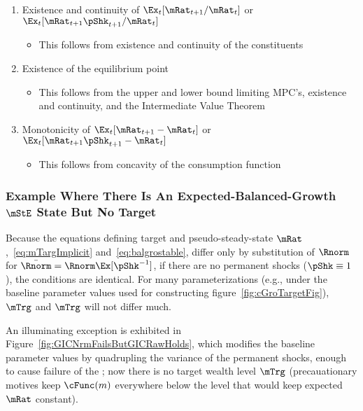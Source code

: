 \documentclass[BufferStockTheory]{subfiles}
\begin{document}
\begin{enumerate}
\item Existence and continuity of $\Ex_{t}[\mRat_{t+1}/\mRat_{t}]$ or $\Ex_{t}[\mRat_{t+1}\pShk_{t+1}/\mRat_{t}]$
  \begin{itemize}
    \item This follows from existence and continuity of the constituents
    \end{itemize}
  \item Existence of the equilibrium point
    \begin{itemize}
    \item This follows from the upper and lower bound limiting MPC's, existence and continuity, and the Intermediate Value Theorem
    \end{itemize}
  \item Monotonicity of $\Ex_{t}[{\mRat}_{t+1}-\mRat_{t}]$ or $\Ex_{t}[{\mRat}_{t+1}\pShk_{t+1}-\mRat_{t}]$
    \begin{itemize}
    \item This follows from concavity of the consumption function
    \end{itemize}
\end{enumerate}

\subsubsection{Example Where There Is An Expected-Balanced-Growth
  \texorpdfstring{$\mStE$}{m} State But No Target}

Because the equations defining target and pseudo-steady-state $\mRat$,~\eqref{eq:mTargImplicit} and~\eqref{eq:balgrostable}, differ only by substitution of $\Rnorm$ for $\bar{\Rnorm}=\Rnorm \Ex[\pShk^{-1}]$, if there are no permanent shocks ($\pShk \equiv 1$), the conditions are identical.  For many parameterizations (e.g., under the baseline parameter values used for constructing figure~\ref{fig:cGroTargetFig}), $\mTrg$ and $\mTrg$ will not differ much.

An illuminating exception is exhibited in Figure~\ref{fig:GICNrmFailsButGICRawHolds}, which modifies the baseline parameter values by quadrupling the variance of the permanent shocks, enough to cause failure of the \GICNrm; now there is no target wealth level $\mTrg$ (precauationary motives keep $\cFunc(m)$ everywhere below the level that would keep expected $\mRat$ constant).


\renewcommand{\figFile}{GICNrmFailsButGICRawHolds}
\hypertarget{\figFile}{}

\end{document}
